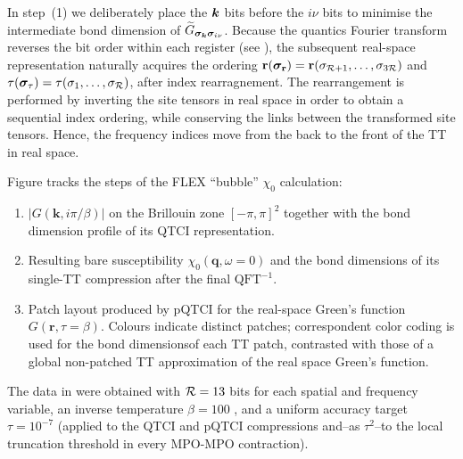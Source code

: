 In step~(1) we deliberately place the \(\boldsymbol{k}\) bits before the \(i\nu\) bits to minimise the intermediate bond dimension of
\(\widetilde G_{\boldsymbol{\sigma}_{\boldsymbol{k}}\boldsymbol{\sigma}_{i\nu}}\). Because the quantics Fourier transform reverses the bit order within each register (see ), the subsequent real-space representation naturally acquires the ordering
\(\mathbf r(\boldsymbol{\sigma}_{\mathbf r})=\mathbf r(\sigma_{\mathcal R+1},\dots,
  \sigma_{3\mathcal R})\) and
\(\tau(\boldsymbol{\sigma}_{\tau})=\tau(\sigma_{1},\dots,\sigma_{\mathcal R})\),
after index rearragnement. The rearrangement is performed by inverting the site tensors in real space in order to obtain a sequential index ordering, while conserving the links between the transformed site tensors. Hence, the frequency indices move from the back to the front of the TT in real space. 

Figure  tracks the steps of the FLEX ``bubble'' $\chi_0$ calculation:
\begingroup
\renewcommand{\labelenumi}{($\alph{enumi}$)}
\begin{enumerate}
    \item  \(\lvert G(\mathbf k,i\pi/\beta)\rvert\) on the Brillouin zone
  \([-\pi,\pi]^{2}\) together with the bond dimension profile of its QTCI representation.
\item Resulting bare susceptibility
  \(\chi_{0}(\mathbf q,\omega\!=\!0)\) and the bond dimensions of its single-TT compression after the final $\text{QFT}^{-1}$.
\item Patch layout produced by pQTCI for the real-space Green’s function \(G(\mathbf r,\tau=\beta)\). Colours indicate distinct patches; correspondent color coding is used for the bond dimensionsof each TT patch, contrasted with those of a global non-patched TT approximation of the real space Green's function.
\end{enumerate}
\endgroup 

The data in  were obtained with $\mathcal{R}=13$ bits for each spatial and frequency variable, an inverse
temperature $\beta=100$ , and a uniform accuracy target $\tau=10^{-7}$ (applied to the QTCI and pQTCI compressions and--as $\tau^2$--to the local truncation threshold in every MPO-MPO contraction).

